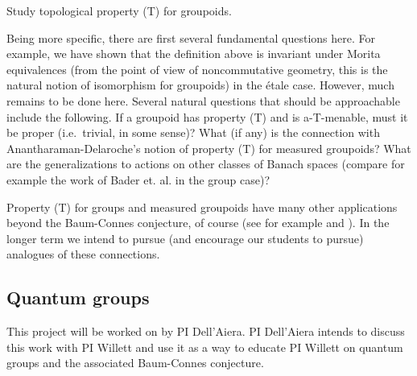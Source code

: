 \begin{project}
Study topological property (T) for groupoids.
\end{project}

Being more specific, there are first several fundamental questions here.  For example, we have shown that the definition above is invariant under Morita equivalences (from the point of view of noncommutative geometry, this is the natural notion of isomorphism for groupoids) in the \'{e}tale case.  However, much remains to be done here.  Several natural questions that should be approachable include the following.  If a groupoid has property (T) and is a-T-menable, must it be proper (i.e.\ trivial, in some sense)?  What (if any) is the connection with Anantharaman-Delaroche's notion of property (T) for measured groupoids?  What are the generalizations to actions on other classes of Banach spaces (compare for example the work of Bader et. al. \cite{Bader:2007eg} in the group case)?

Property (T) for groups and measured groupoids have many other applications beyond the Baum-Connes conjecture, of course (see for example \cite[Chapter 6]{Bekka:2000kx} and \cite{Zimmer:2981ds}).  In the longer term we intend to pursue (and encourage our students to pursue) analogues of these connections.  








 
 
 \subsection{Quantum groups}     
 
This project will be worked on by PI Dell'Aiera.  PI Dell'Aiera intends to discuss this work with PI Willett and use it as a way to educate PI Willett on quantum groups and the associated Baum-Connes conjecture.
 
